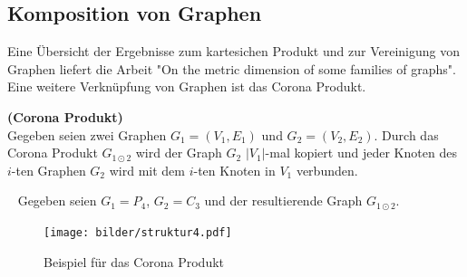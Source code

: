 \subsection{Komposition von Graphen}
Eine Übersicht der Ergebnisse zum kartesichen Produkt und zur Vereinigung von Graphen liefert die Arbeit "On the metric dimension of some families of graphs"\cite{families}. Eine weitere Verknüpfung von Graphen ist das Corona Produkt.

\begin{defi}{\textbf{(Corona Produkt)}}\\
Gegeben seien zwei Graphen $G_1=(V_1,E_1)$ und $G_2=(V_2,E_2)$. Durch das Corona Produkt $G_{1 \odot 2}$ wird der Graph $G_2$ $|V_1|$-mal kopiert und jeder Knoten des $i$-ten Graphen $G_2$ wird mit dem $i$-ten Knoten in $V_1$ verbunden.
\end{defi}
\begin{bsp} ~ \newline
Gegeben seien $G_1=P_4$, $G_2=C_3$ und der resultierende Graph $G_{1 \odot 2}$.\newline
\vspace{-1mm}
\begin{figure}[ht]
		\centering 		 
   \texttt{[image: bilder/struktur4.pdf]}
	\caption{Beispiel für das Corona Produkt}
  	 \label{bild:vereinigung}
  	 \end{figure}
  	 \vspace{-7mm}
  	 ~\linebreak
\end{bsp}
